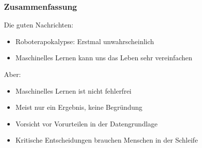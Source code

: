 \documentclass[aspectratio=169,x11names]{beamer}
\begin{document}





\begin{frame}
\frametitle{Zusammenfassung}

Die guten Nachrichten:

\begin{itemize}
\color{Green4}
\pause\item Roboterapokalypse: Erstmal unwahrscheinlich
\pause\item Maschinelles Lernen kann uns das Leben sehr vereinfachen
\end{itemize}
\bigskip

Aber:

\begin{itemize}
\color{Firebrick1}
\pause\item Maschinelles Lernen ist nicht fehlerfrei
\pause\item Meist nur ein Ergebnis, keine Begründung
\pause\item Vorsicht vor Vorurteilen in der Datengrundlage
\pause\item Kritische Entscheidungen brauchen Menschen in der Schleife
\end{itemize}

\end{frame}
\end{document}
